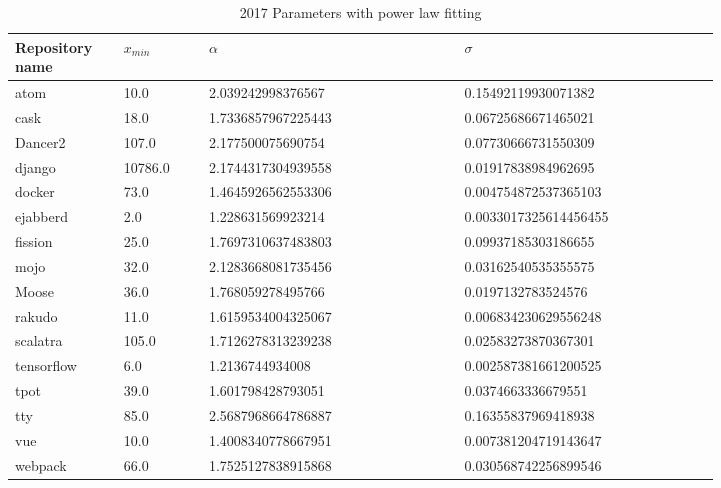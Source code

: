 \documentclass[conference]{IEEEtran}
\begin{document}
\begin{table}[htbp]
	\caption{2017 Parameters with power law fitting}
	\begin{center}
		\begin{tabular}{| p{0.12\linewidth} | p{0.1\linewidth} | p{0.3\linewidth} | p{0.3\linewidth} |}
			\hline
Repository name &$x_{min}$ & $\alpha$ & $\sigma$\\
\hline
atom &10.0 &2.039242998376567  &0.15492119930071382 \\
cask &18.0 &1.7336857967225443  &0.06725686671465021 \\
Dancer2 &107.0 &2.177500075690754  &0.07730666731550309 \\
django &10786.0 &2.1744317304939558  &0.01917838984962695 \\
docker &73.0 &1.4645926562553306  &0.004754872537365103\\
ejabberd &2.0 &1.228631569923214  &0.0033017325614456455 \\
fission &25.0 &1.7697310637483803  &0.09937185303186655 \\
mojo &32.0 &2.1283668081735456  &0.03162540535355575 \\
Moose &36.0 &1.768059278495766  &0.0197132783524576 \\
rakudo &11.0 &1.6159534004325067  &0.006834230629556248 \\
scalatra &105.0 &1.7126278313239238  &0.02583273870367301 \\
tensorflow &6.0 &1.2136744934008  &0.002587381661200525 \\
tpot &39.0 &1.601798428793051 &0.0374663336679551 \\
tty &85.0 &2.5687968664786887  &0.16355837969418938 \\
vue &10.0 &1.4008340778667951  &0.007381204719143647\\
webpack &66.0 &1.7525127838915868 &0.030568742256899546\\ 
			\hline
		\end{tabular}
	\end{center}
\label{tab:2017pars}
\end{table}
\end{document}
